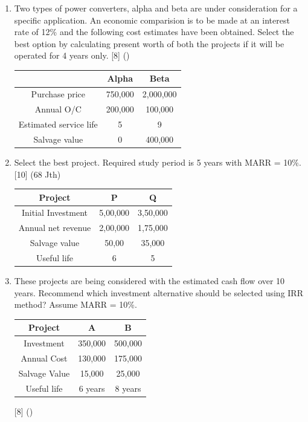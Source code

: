 \documentclass[12pt]{article}
\begin{document}
\begin{enumerate}
			\item Two types of power converters, alpha and beta are under consideration for a specific application. An economic comparision is to be made at an interest rate of 12\% and the following cost estimates have been obtained. Select the best option by calculating present worth of both the projects if it will be operated for 4 years only. \hfill [8] ()\\
			\begin{tabular}{|c|c|c|}
				\hline
				& Alpha & Beta \\ \hline
				Purchase price & 750,000 & 2,000,000 \\ \hline
				Annual O/C & 200,000 & 100,000 \\ \hline
				Estimated service life & 5 & 9 \\ \hline
				Salvage value & 0 & 400,000 \\ \hline
			\end{tabular}
			
			\item Select the best project. Required study period is 5 years with MARR = 10\%. \hfill [10] (68 Jth)
			\begin{tabular}{|c|c|c|}
				\hline
				Project & P & Q \\ \hline
				Initial Investment & 5,00,000 & 3,50,000 \\ \hline
				Annual net revenue & 2,00,000 & 1,75,000 \\ \hline
				Salvage value & 50,00 & 35,000 \\ \hline
				Useful life & 6 & 5 \\ \hline
			\end{tabular}

			\item These projects are being considered with the estimated cash flow over 10 years. Recommend which investment alternative should be selected using IRR method? Assume MARR = 10\%. 
			\begin{tabular}{|c|c|c|}
				\hline
				Project & A & B \\ \hline
				Investment & 350,000 & 500,000 \\ \hline
				Annual Cost & 130,000 & 175,000 \\ \hline
				Salvage Value & 15,000 & 25,000 \\ \hline
				Useful life & 6 years & 8 years \\ \hline
			\end{tabular} \hfill [8] ()


\end{enumerate}
\end{document}
